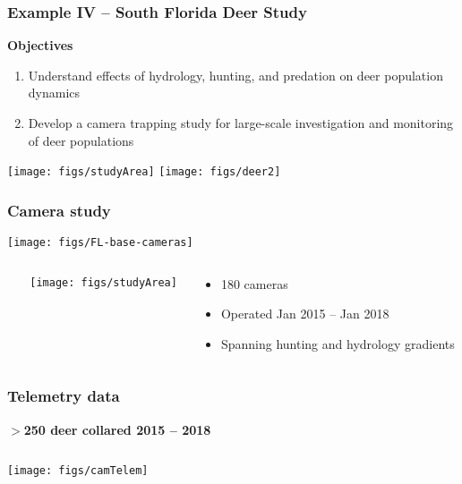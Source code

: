 \documentclass[color=usenames,dvipsnames]{beamer}
\begin{document}
\begin{frame}
  \frametitle{Example IV -- South Florida Deer Study}
  \large
  {\bf Objectives}
  \begin{enumerate}[\bf 1.]
    \item Understand effects of hydrology, hunting, and predation on
    deer population dynamics 
    \item<1-> Develop a camera trapping study for large-scale
    investigation and monitoring of deer populations
  \end{enumerate}
  \vfill
  \texttt{[image: figs/studyArea]} \hfill
  \texttt{[image: figs/deer2]}
\end{frame}





\begin{frame}
  \frametitle{Camera study}
  \centering
  \texttt{[image: figs/FL-base-cameras]} \\
  \vfill
  \begin{columns}
    \begin{column}{0.05\textwidth}
    \end{column}
    \begin{column}{0.35\textwidth}
      \texttt{[image: figs/studyArea]}
    \end{column}
    \begin{column}{0.6\textwidth}
      \small
      \begin{itemize}
        \item 180 cameras
        \item Operated Jan 2015 -- Jan 2018
        \item Spanning hunting and hydrology gradients
      \end{itemize}
    \end{column}
  \end{columns}
\end{frame}




\begin{frame}
  \frametitle{Telemetry data}
  \centering
  \bf
  $>$250 deer collared 2015 -- 2018 \\
  \begin{columns}
    \column{\dimexpr\paperwidth-10pt}
    \texttt{[image: figs/camTelem]}
  \end{columns}
\end{frame}
\end{document}
